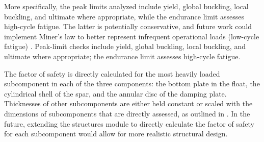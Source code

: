     More specifically, the peak limits analyzed include yield, global buckling, local buckling, and ultimate where appropriate, while the endurance limit assesses high-cycle fatigue.
    The latter is potentially conservative, and future work could implement Miner's law to better represent infrequent operational loads (low-cycle fatigue) \citep{ove_arup__partners_ltd_structural_2016}.
\else
    Peak-limit checks include yield, global buckling, local buckling, and ultimate where appropriate;
    the endurance limit assesses high-cycle fatigue.
\fi

The factor of safety is directly calculated for the most heavily loaded subcomponent in each of the three components: the bottom plate in the float, the cylindrical shell of the spar, and the annular disc of the damping plate.
Thicknesses of other subcomponents are either held constant or scaled with the dimensions of subcomponents that are directly assessed, as outlined in .
\ifdefined\DISSERTATION
    In the future, extending the structures module to directly calculate the factor of safety for each subcomponent would allow for more realistic structural design.
\fi

